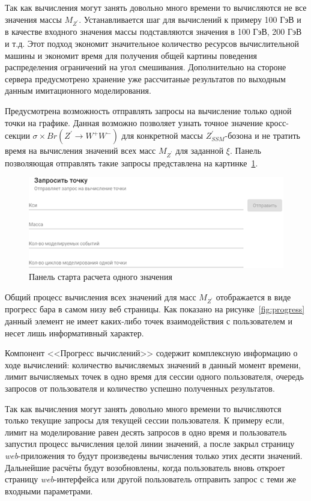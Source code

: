Так как вычисления могут занять довольно много времени то вычисляются не все значения массы ${M}_{{Z}^{\prime}}$. Устанавливается шаг для вычислений к примеру 100 ГэВ и в качестве входного значения массы подставляются значения в 100 ГэВ, 200 ГэВ и т.д. Этот подход экономит значительное количество ресурсов вычислительной машины и экономит время для получения общей картины поведения распределения ограничений на угол смешивания. Дополнительно на стороне сервера предусмотрено хранение уже рассчитаные результатов по выходным данным имитационного моделирования.


Предусмотрена возможность отправлять запросы на вычисление только одной точки на графике. Данная возможно позволяет узнать точное значение кросс-секции $\sigma \times Br({Z}^{\prime} \rightarrow {W}^{+}{W}^{-})$ для конкретной массы ${Z}^{\prime}_{SSM}$-бозона и не тратить время на вычисления значений всех масс ${M}_{{Z}^{\prime}}$ для заданной $\xi$. Панель позволяющая отправлять такие запросы представлена на картинке~\ref{fig:request-point}.

\vspace{16pt}
\begin{figure}[!h]
	\centering
	\includegraphics[width=\textwidth]{figures/request-point.png}
	\caption{Панель старта расчета одного значения}
	\label{fig:request-point}
\end{figure}

Общий процесс вычисления всех значений для масс ${M}_{{Z}^{\prime}}$ отображается в виде прогресс бара в самом низу веб страницы. Как показано на рисунке~\ref{fig:progress} данный элемент не имеет каких-либо точек взаимодействия с пользователем и несет лишь информативный характер.

Компонент <<Прогресс вычислений>> содержит комплексную информацию о ходе вычислений: количество вычисляемых значений в данный момент времени, лимит вычисляемых точек в одно время для сессии одного пользователя, очередь запросов от пользователя и количество успешно полученных результатов.

Так как вычисления могут занять довольно много времени то вычисляются только текущие запросы для текущей сессии пользователя. К примеру если, лимит на моделирование равен десять запросов в одно время и пользователь запустил процесс вычисления целой линии значений, а после закрыл страницу \textit{web}-приложения то будут произведены вычисления только этих десяти значений. Дальнейшие расчёты будут возобновлены, когда пользователь вновь откроет страницу \textit{web}-интерфейса или другой пользователь отправить запрос с теми же входными параметрами.

